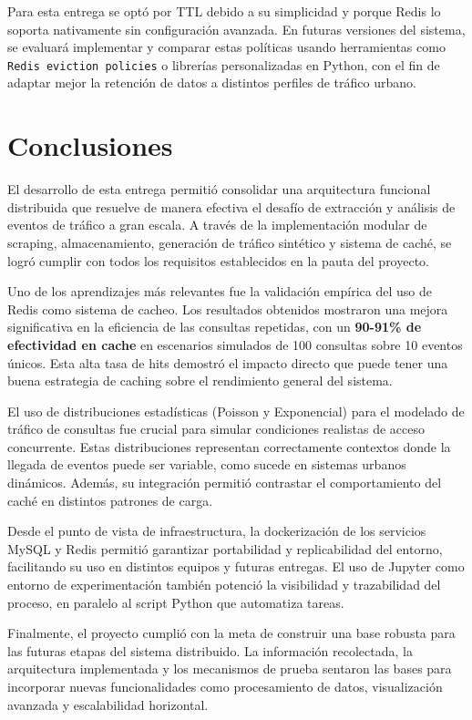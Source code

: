\documentclass[12pt]{article}
\begin{document}
Para esta entrega se optó por TTL debido a su simplicidad y porque Redis lo soporta nativamente sin configuración avanzada. En futuras versiones del sistema, se evaluará implementar y comparar estas políticas usando herramientas como \texttt{Redis eviction policies} o librerías personalizadas en Python, con el fin de adaptar mejor la retención de datos a distintos perfiles de tráfico urbano.



\section{Conclusiones}

El desarrollo de esta entrega permitió consolidar una arquitectura funcional distribuida que resuelve de manera efectiva el desafío de extracción y análisis de eventos de tráfico a gran escala. A través de la implementación modular de scraping, almacenamiento, generación de tráfico sintético y sistema de caché, se logró cumplir con todos los requisitos establecidos en la pauta del proyecto.

Uno de los aprendizajes más relevantes fue la validación empírica del uso de Redis como sistema de cacheo. Los resultados obtenidos mostraron una mejora significativa en la eficiencia de las consultas repetidas, con un \textbf{90-91\% de efectividad en cache} en escenarios simulados de 100 consultas sobre 10 eventos únicos. Esta alta tasa de hits demostró el impacto directo que puede tener una buena estrategia de caching sobre el rendimiento general del sistema.

El uso de distribuciones estadísticas (Poisson y Exponencial) para el modelado de tráfico de consultas fue crucial para simular condiciones realistas de acceso concurrente. Estas distribuciones representan correctamente contextos donde la llegada de eventos puede ser variable, como sucede en sistemas urbanos dinámicos. Además, su integración permitió contrastar el comportamiento del caché en distintos patrones de carga.

Desde el punto de vista de infraestructura, la dockerización de los servicios MySQL y Redis permitió garantizar portabilidad y replicabilidad del entorno, facilitando su uso en distintos equipos y futuras entregas. El uso de Jupyter como entorno de experimentación también potenció la visibilidad y trazabilidad del proceso, en paralelo al script Python que automatiza tareas.

Finalmente, el proyecto cumplió con la meta de construir una base robusta para las futuras etapas del sistema distribuido. La información recolectada, la arquitectura implementada y los mecanismos de prueba sentaron las bases para incorporar nuevas funcionalidades como procesamiento de datos, visualización avanzada y escalabilidad horizontal.
\end{document}
